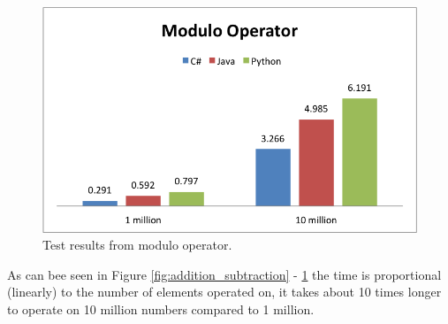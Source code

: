 \begin{figure}[h]
	\centering
	\includegraphics[width=0.48\linewidth]{chapters/media/modulo.png}
	\caption{Test results from modulo operator.}
	\label{fig:modulo}
\end{figure}

As can bee seen in Figure \ref{fig:addition_subtraction} - \ref{fig:modulo} the time is proportional (linearly) to the number of elements operated on, it takes about 10 times longer to operate on 10 million numbers compared to 1 million.  
